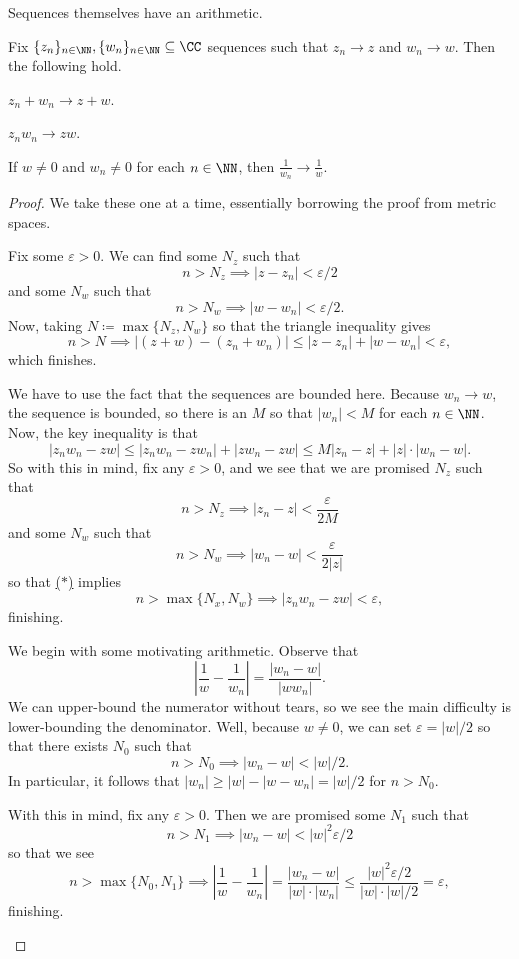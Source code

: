 \documentclass[../notes.tex]{subfiles}
\begin{document}
Sequences themselves have an arithmetic.
\begin{proposition}
	Fix $\{z_n\}_{n\in\NN},\{w_n\}_{n\in\NN}\subseteq\CC$ sequences such that $z_n\to z$ and $w_n\to w$. Then the following hold.
	\begin{listalph}
		\item $z_n+w_n\to z+w$.
		\item $z_nw_n\to zw$.
		\item If $w\ne0$ and $w_n\ne0$ for each $n\in\NN$, then $\frac1{w_n}\to\frac1w$.
	\end{listalph}
\end{proposition}
\begin{proof}
	We take these one at a time, essentially borrowing the proof from metric spaces.
	\begin{listalph}
		\item Fix some $\varepsilon>0$. We can find some $N_z$ such that
		\[n>N_z\implies|z-z_n|<\varepsilon/2\]
		and some $N_w$ such that
		\[n>N_w\implies|w-w_n|<\varepsilon/2.\]
		Now, taking $N\coloneqq \max\{N_z,N_w\}$ so that the triangle inequality gives
		\[n>N\implies|(z+w)-(z_n+w_n)|\le|z-z_n|+|w-w_n|<\varepsilon,\]
		which finishes.

		\item We have to use the fact that the sequences are bounded here. Because $w_n\to w$, the sequence is bounded, so there is an $M$ so that $|w_n|<M$ for each $n\in\NN$. Now, the key inequality is that
		\[|z_nw_n-zw|\le|z_nw_n-zw_n|+|zw_n-zw|\le M|z_n-z|+|z|\cdot|w_n-w|.\tag{$*$}\label{eq:multbound}\]
		So with this in mind, fix any $\varepsilon>0$, and we see that we are promised $N_z$ such that
		\[n>N_z\implies|z_n-z|<\frac\varepsilon{2M}\]
		and some $N_w$ such that
		\[n>N_w\implies|w_n-w|<\frac\varepsilon{2|z|}\]
		so that \hyperref[eq:multbound]{($*$)} implies
		\[n>\max\{N_x,N_w\}\implies|z_nw_n-zw|<\varepsilon,\]
		finishing.

		\item We begin with some motivating arithmetic. Observe that
		\[\left|\frac1w-\frac1{w_n}\right|=\frac{|w_n-w|}{|ww_n|}.\]
		We can upper-bound the numerator without tears, so we see the main difficulty is lower-bounding the denominator. Well, because $w\ne0$, we can set $\varepsilon=|w|/2$ so that there exists $N_0$ such that
		\[n>N_0\implies|w_n-w|<|w|/2.\]
		In particular, it follows that $|w_n|\ge|w|-|w-w_n|=|w|/2$ for $n>N_0$.

		With this in mind, fix any $\varepsilon>0$. Then we are promised some $N_1$ such that
		\[n>N_1\implies|w_n-w|<|w|^2\varepsilon/2\]
		so that we see
		\[n>\max\{N_0,N_1\}\implies\left|\frac1w-\frac1{w_n}\right|=\frac{|w_n-w|}{|w|\cdot|w_n|}\le\frac{|w|^2\varepsilon/2}{|w|\cdot|w|/2}=\varepsilon,\]
		finishing.
		\qedhere
	\end{listalph}
\end{proof}
\end{document}
